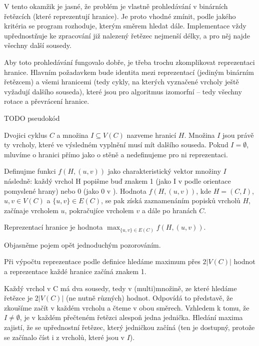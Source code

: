 V tento okamžik je jasné, že problém je vlastně prohledávání v binárních řetězcích (které reprezentují hranice). Je proto vhodné zmínit, podle jakého kritéria se program rozhoduje, kterým směrem hledat dále. Implementace vždy upřednostňuje ke zpracování již nalezený řetězec nejmenší délky, a pro něj najde všechny další sousedy.

Aby toto prohledávání fungovalo dobře, je třeba trochu zkomplikovat reprezentaci hranice. Hlavním požadavkem bude identita mezi reprezentací (jediným binárním řetězcem) a všemi hranicemi (tedy cykly, na kterých vyznačené vrcholy ještě vyžadují dalšího souseda), které jsou pro algoritmus izomorfní -- tedy všechny rotace a převrácení hranice.

TODO pseudokód

\begin{definice}\label{def01:1}
Dvojici cyklus $C$ a množina $I \subseteq V(C)$ nazveme hranicí $H$. Množina $I$ jsou právě ty vrcholy, které ve výsledném vyplnění musí mít dalšího souseda. Pokud  $I = \emptyset$, mluvíme o hranici přímo jako o stěně a nedefinujeme pro ni reprezentaci.

Definujme funkci $f(H,(u,v))$ jako charakteristický vektor množiny $I$ následně: každý vrchol H popišme buď znakem 1 (jako I v  podle orientace pomyslené hrany) nebo 0 (jako 0 v ). Hodnota $f(H, (u, v))$, kde $H=(C, I)$, $u, v \in V(C)$ a $ \lbrace u, v \rbrace \in E(C)$, se pak získá zaznamenáním popisků vrcholů $H$, začínaje vrcholem $u$, pokračujíce vrcholem $v$ a dále po hranách $C$. 

Reprezentací hranice je hodnota $\max_{\lbrace u, v \rbrace \in E(C)} {f(H,(u,v))}$.
\end{definice}

Objasněme pojem opět jednoduchým pozorováním.

\begin{tvrz}
Při výpočtu reprezentace podle definice hledáme maximum přes $2 |V(C)|$ hodnot a reprezentace každé hranice začíná znakem 1.
\end{tvrz}

\begin{dukaz}
Každý vrchol v C má dva sousedy, tedy v (multi)množině, ze které hledáme řetězce je $2 |V(C)|$ (ne nutně různých) hodnot. Odpovídá to představě, že zkoušíme začít v každém vrcholu a čteme v obou směrech. Vzhledem k tomu, že $I\neq \emptyset$, je v každém přečteném řetězci alespoň jedna jednička. Hledání maxima zajistí, že se upřednostní řetězec, který jedničkou začíná (ten je dostupný, protože se začínalo číst i z vrcholů, které jsou v $I$).  
\end{dukaz}

